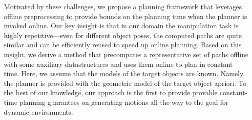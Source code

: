 \documentclass[conference]{IEEEtran}
\begin{document}
Motivated by these challenges, we propose a planning framework that leverages offline preprocessing to provide bounds on the planning time when the planner is invoked online. Our key insight is that in our domain the manipulation task is highly repetitive---even for different object poses, the computed paths are quite similar and can be efficiently reused to speed up online planning. Based on this insight, we derive a method that precomputes a representative set of paths offline with some auxiliary datastructures and uses them online to plan in constant time. Here, we assume that the models of the target objects are known. Namely, the planner is provided with the geometric model of the target object apriori. To the best of our knowledge, our approach is the first to provide provable constant-time planning guarantees on generating motions all the way to the goal for dynamic environments.
\end{document}
